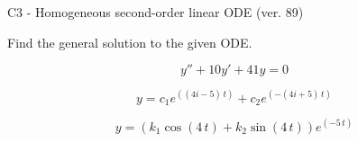 \begin{exercise}
  \begin{exerciseTitle}C3 - Homogeneous second-order linear ODE (ver. 89)\end{exerciseTitle}
  \begin{exerciseStatement}
    
Find the general solution to the given ODE.

    
\[y''+10y'+41y = 0\]

  \end{exerciseStatement}
  \begin{exerciseAnswer}
    
\[y= c_{1} e^{\left(\left(4 i - 5\right) \, t\right)} + c_{2} e^{\left(-\left(4 i + 5\right) \, t\right)}\]

    
\[y= {\left(k_{1} \cos\left(4 \, t\right) + k_{2} \sin\left(4 \, t\right)\right)} e^{\left(-5 \, t\right)}\]

  \end{exerciseAnswer}
\end{exercise}